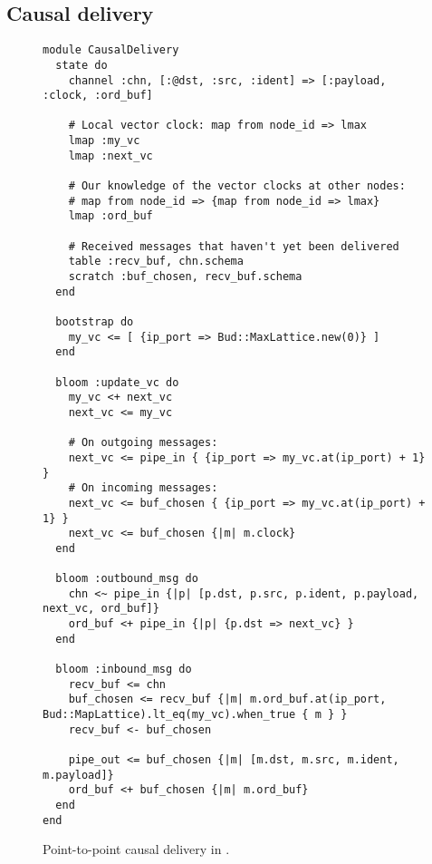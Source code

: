 \subsection{Causal delivery}

\begin{figure}[t]
\begin{scriptsize}
\begin{lstlisting}
module CausalDelivery
  state do
    channel :chn, [:@dst, :src, :ident] => [:payload, :clock, :ord_buf]

    # Local vector clock: map from node_id => lmax
    lmap :my_vc
    lmap :next_vc

    # Our knowledge of the vector clocks at other nodes:
    # map from node_id => {map from node_id => lmax}
    lmap :ord_buf

    # Received messages that haven't yet been delivered
    table :recv_buf, chn.schema
    scratch :buf_chosen, recv_buf.schema
  end

  bootstrap do
    my_vc <= [ {ip_port => Bud::MaxLattice.new(0)} ]
  end

  bloom :update_vc do
    my_vc <+ next_vc
    next_vc <= my_vc

    # On outgoing messages:
    next_vc <= pipe_in { {ip_port => my_vc.at(ip_port) + 1} }
    # On incoming messages:
    next_vc <= buf_chosen { {ip_port => my_vc.at(ip_port) + 1} }
    next_vc <= buf_chosen {|m| m.clock}
  end

  bloom :outbound_msg do
    chn <~ pipe_in {|p| [p.dst, p.src, p.ident, p.payload, next_vc, ord_buf]}
    ord_buf <+ pipe_in {|p| {p.dst => next_vc} }
  end

  bloom :inbound_msg do
    recv_buf <= chn
    buf_chosen <= recv_buf {|m| m.ord_buf.at(ip_port, Bud::MapLattice).lt_eq(my_vc).when_true { m } }
    recv_buf <- buf_chosen

    pipe_out <= buf_chosen {|m| [m.dst, m.src, m.ident, m.payload]}
    ord_buf <+ buf_chosen {|m| m.ord_buf}
  end
end
\end{lstlisting}
\end{scriptsize}
\caption{Point-to-point causal delivery in \lang.}
\label{fig:causal-delivery-src}
\end{figure}
